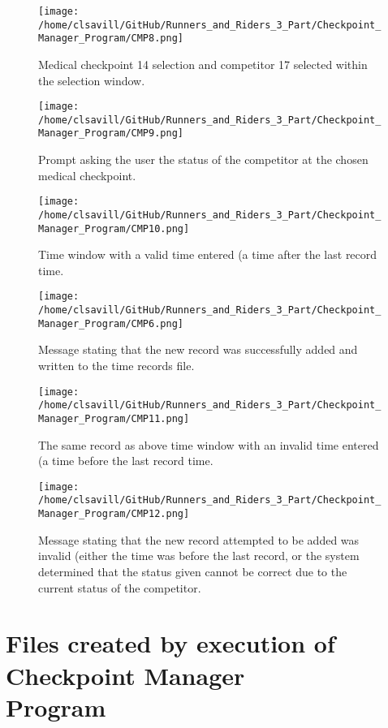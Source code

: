 \documentclass[a4paper,12pt]{article}
\begin{document}
\begin{figure}[H]
\texttt{[image: /home/clsavill/GitHub/Runners\_and\_Riders\_3\_Part/Checkpoint\_Manager\_Program/CMP8.png]}
\caption{Medical checkpoint 14 selection and competitor 17 selected within the selection window.}
\end{figure}

\begin{figure}[H]
\texttt{[image: /home/clsavill/GitHub/Runners\_and\_Riders\_3\_Part/Checkpoint\_Manager\_Program/CMP9.png]}
\caption{Prompt asking the user the status of the competitor at the chosen medical checkpoint.}
\end{figure}

\begin{figure}[H]
\texttt{[image: /home/clsavill/GitHub/Runners\_and\_Riders\_3\_Part/Checkpoint\_Manager\_Program/CMP10.png]}
\caption{Time window with a valid time entered (a time after the last record time.}
\end{figure}

\begin{figure}[H]
\texttt{[image: /home/clsavill/GitHub/Runners\_and\_Riders\_3\_Part/Checkpoint\_Manager\_Program/CMP6.png]}
\caption{Message stating that the new record was successfully added and written to the time records file.}
\end{figure}

\begin{figure}[H]
\texttt{[image: /home/clsavill/GitHub/Runners\_and\_Riders\_3\_Part/Checkpoint\_Manager\_Program/CMP11.png]}
\caption{The same record as above time window with an invalid time entered (a time before the last record time.}
\end{figure}

\begin{figure}[H]
\texttt{[image: /home/clsavill/GitHub/Runners\_and\_Riders\_3\_Part/Checkpoint\_Manager\_Program/CMP12.png]}
\caption{Message stating that the new record attempted to be added was invalid (either the time was before the last record, or the system determined that the status given cannot be correct due to the current status of the competitor.}
\end{figure}

\section{Files created by execution of Checkpoint Manager\\Program}

\end{document}
